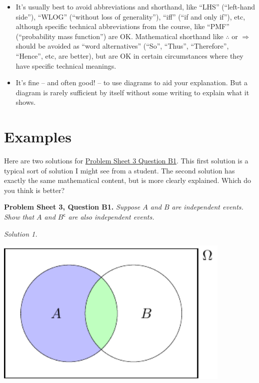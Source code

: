 \documentclass[
  a4paper,
]{book}
\theoremstyle{definition}
\theoremstyle{definition}
\theoremstyle{definition}
\theoremstyle{definition}
\theoremstyle{remark}
\begin{document}
\begin{itemize}
\item
  It's usually best to avoid abbreviations and shorthand, like ``LHS'' (``left-hand side''), ``WLOG'' (``without loss of generality''), ``iff'' (``if and only if''), etc, although specific technical abbreviations from the course, like ``PMF'' (``probability mass function'') are OK. Mathematical shorthand like \(\therefore\) or \(\Rightarrow\) should be avoided as ``word alternatives'' (``So'', ``Thus'', ``Therefore'', ``Hence'', etc, are better), but are OK in certain circumstances where they have specific technical meanings.
\item
  It's fine -- and often good! -- to use diagrams to aid your explanation. But a diagram is rarely sufficient by itself without some writing to explain what it shows.
\end{itemize}

\hypertarget{writing-ex}{%
\section*{Examples}\label{writing-ex}}

Here are two solutions for \protect\hyperlink{P3-long}{Problem Sheet 3 Question B1}. This first solution is a typical sort of solution I might see from a student. The second solution has exactly the same mathematical content, but is more clearly explained. Which do you think is better?

\textbf{Problem Sheet 3, Question B1.} \emph{Suppose \(A\) and \(B\) are independent events. Show that \(A\) and \(B^\mathsf{c}\) are also independent events.}

\emph{Solution 1.}

\begin{center}\includegraphics[width=320pt]{math1710_files/figure-latex/writing-pic-0-1} \end{center}
\end{document}

